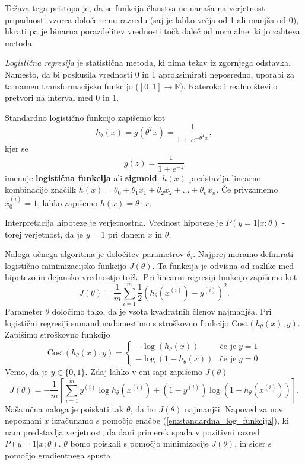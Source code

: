 \documentclass[11pt,a4paper,openany]{book}
\begin{document}
Težava tega pristopa je, da se funkcija članstva ne nanaša na verjetnost pripadnosti vzorca določenemu razredu (saj je lahko večja od 1 ali manjša od 0), hkrati pa je binarna porazdelitev vrednosti točk daleč od normalne, ki jo zahteva metoda.

\textit{Logistična regresija} je statistična metoda, ki nima težav iz zgornjega odstavka. Namesto, da bi poskusila vrednosti 0 in 1 aproksimirati neposredno, uporabi za ta namen transformacijsko funkcijo ($[0, 1] \rightarrow \mathbb{R}$). Katerokoli realno število pretvori na interval med 0 in 1.

Standardno logistično funkcijo zapišemo kot
\begin{equation}
	\label{en:standardna_log_funkcija}
	h_\theta(x) = g(\theta^Tx) = \frac{1}{1 + e^{-\theta^Tx}},
\end{equation}
kjer se
\begin{equation}
	g(z) = \frac{1}{1 + e^{-z}}
\end{equation}
imenuje \textbf{logistična funkcija} ali \textbf{sigmoid}. $h(x)$ predstavlja linearno kombinacijo značilk $h(x) = \theta_0 + \theta_1x_1 + \theta_2x_2 + \dots + \theta_nx_n$. Če privzamemo $x_0^{(i)} = 1$, lahko zapišemo $h(x) = \theta \cdot x$.

Interpretacija hipoteze je verjetnostna. Vrednost hipoteze je $P(y=1|x;\theta)$ - torej verjetnost, da je $y = 1$ pri danem $x$ in $\theta$.

Naloga učnega algoritma je določitev parametrov $\theta_i$. Najprej moramo definirati logistično minimizacijsko funkcijo $J(\theta)$. Ta funkcija je odvisna od razlike med hipotezo in dejansko vrednostjo točk. Pri linearni regresiji funkcijo zapišemo kot
\begin{equation}
	J(\theta) = \frac{1}{m} \sum^m_{i = 1} \frac{1}{2} \left( h_\theta(x^{(i)}) - y^{(i)}\right)^2.
\end{equation}
Parameter $\theta$ določimo tako, da je vsota kvadratnih členov najmanjša. Pri logistični regresiji sumand nadomestimo s stroškovno funkcijo $\text{Cost}(h_\theta(x), y)$. Zapišimo stroškovno funkcijo
\begin{equation}
	\text{Cost}(h_\theta(x), y) = \left\{
	\begin{array}{rl}
		-\log(h_\theta(x)) & \text{če je} \; y = 1 \\
		-\log(1 - h_\theta(x)) & \text{če je} \; y = 0
	\end{array}
	\right.
\end{equation}
Vemo, da je $y \in \{0, 1\}$. Zdaj lahko v eni sapi zapišemo $J(\theta)$
\begin{equation}
	J(\theta) = -\frac{1}{m} \left[ 
		\sum^m_{i = 1}
			y^{(i)} \log h_\theta(x^{(i)}) + (1 - y^{(i)}) \log (1 - h_\theta(x^{(i)}))
	\right].
	\label{en:j_theta}
\end{equation}
Naša učna naloga je poiskati tak $\theta$, da bo $J(\theta)$ najmanjši. Napoved za nov nepoznani $x$ izračunamo s pomočjo enačbe (\ref{en:standardna_log_funkcija}), ki nam predstavlja verjetnost, da dani primerek spada v pozitivni razred $P(y = 1 | x;\theta)$. $\theta$ bomo poiskali s pomočjo minimizacije $J(\theta)$, in sicer s pomočjo gradientnega spusta.
\end{document}
